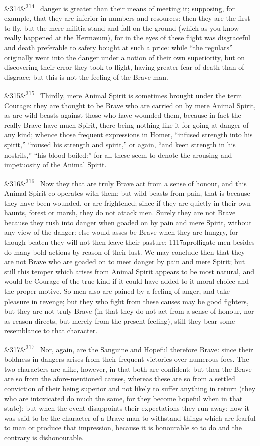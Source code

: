 \documentclass[12pt]{article}
\newcommand{\para}[1][]{\par\noindent\ifx&#1&\else\textsuperscript{\footnotesize #1}~\fi}
\begin{document}
\para[314] danger is greater than their means of meeting it; supposing, for example, that they are inferior in numbers and resources: then they are the first to fly, but the mere militia stand and fall on the ground (which as you know really happened at the Hermæum), for in the eyes of these flight was disgraceful and death preferable to safety bought at such a price: while “the regulars” originally went into the danger under a notion of their own superiority, but on discovering their error they took to flight, having greater fear of death than of disgrace; but this is not the feeling of the Brave man.

\para[315] Thirdly, mere Animal Spirit is sometimes brought under the term Courage: they are thought to be Brave who are carried on by mere Animal Spirit, as are wild beasts against those who have wounded them, because in fact the really Brave have much Spirit, there being nothing like it for going at danger of any kind; whence those frequent expressions in Homer, “infused strength into his spirit,” “roused his strength and spirit,” or again, “and keen strength in his nostrils,” “his blood boiled:” for all these seem to denote the arousing and impetuosity of the Animal Spirit.

\para[316] Now they that are truly Brave act from a sense of honour, and this Animal Spirit co-operates with them; but wild beasts from pain, that is because they have been wounded, or are frightened; since if they are quietly in their own haunts, forest or marsh, they do not attack men. Surely they are not Brave because they rush into danger when goaded on by pain and mere Spirit, without any view of the danger: else would asses be Brave when they are hungry, for though beaten they will not then leave their pasture: 1117aprofligate men besides do many bold actions by reason of their lust. We may conclude then that they are not Brave who are goaded on to meet danger by pain and mere Spirit; but still this temper which arises from Animal Spirit appears to be most natural, and would be Courage of the true kind if it could have added to it moral choice and the proper motive. So men also are pained by a feeling of anger, and take pleasure in revenge; but they who fight from these causes may be good fighters, but they are not truly Brave (in that they do not act from a sense of honour, nor as reason directs, but merely from the present feeling), still they bear some resemblance to that character.

\para[317] Nor, again, are the Sanguine and Hopeful therefore Brave: since their boldness in dangers arises from their frequent victories over numerous foes. The two characters are alike, however, in that both are confident; but then the Brave are so from the afore-mentioned causes, whereas these are so from a settled conviction of their being superior and not likely to suffer anything in return (they who are intoxicated do much the same, for they become hopeful when in that state); but when the event disappoints their expectations they run away: now it was said to be the character of a Brave man to withstand things which are fearful to man or produce that impression, because it is honourable so to do and the contrary is dishonourable.
\end{document}
